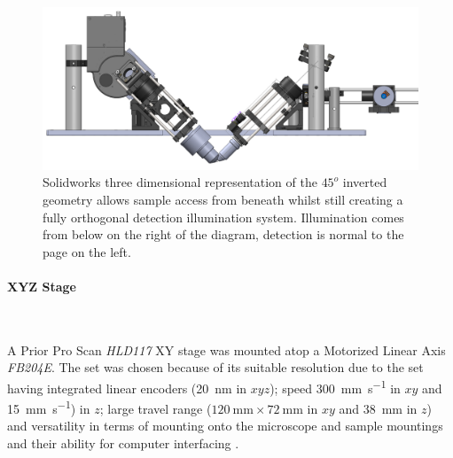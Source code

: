 \begin{figure}
\centering
\includegraphics[width=1\linewidth]{"Figures/solidworks_design _front"}
\caption[CAD design of the $45^o$ detection and excitation]{Solidworks three dimensional representation of the $45^o$ inverted geometry allows sample access from beneath whilst still creating a fully orthogonal detection illumination system.
Illumination comes from below on the right of the diagram, detection is normal to the page on the left.}
\label{fig:solidworks_design_front}
\end{figure}

\paragraph{XYZ Stage}~

A Prior Pro Scan \textit{HLD117} XY stage was mounted atop a Motorized Linear Axis \textit{FB204E}.
The set was chosen because of its suitable resolution due to the set having integrated linear encoders (\SI{20}{\nano\meter} in $xyz$); speed \SI{300}{\milli\meter\per\second} in $xy$ and \SI{15}{\milli\meter\per\second}) in $z$; large travel range ($\SI{120}{\milli\meter} \times \SI{72}{\milli\meter} $ in $xy$ and \SI{38}{\milli\meter} in $z$) and versatility in terms of mounting onto the microscope and sample mountings and their ability for computer interfacing \cite{Hu2014}.
%
%
